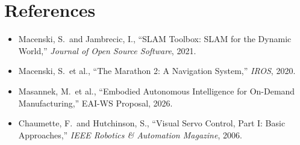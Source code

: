 \documentclass[11pt,a4paper]{article}
\begin{document}
\section{References}

\begin{itemize}[label=\textbullet, leftmargin=1.5em]
    \item Macenski, S.\ and Jambrecic, I., ``SLAM Toolbox: SLAM for the Dynamic World,''
          \textit{Journal of Open Source Software}, 2021.
    \item Macenski, S.\ et al., ``The Marathon 2: A Navigation System,'' \textit{IROS}, 2020.
    \item Masannek, M.\ et al., ``Embodied Autonomous Intelligence for On-Demand
          Manufacturing,'' EAI-WS Proposal, 2026.
    \item Chaumette, F.\ and Hutchinson, S., ``Visual Servo Control, Part I: Basic
          Approaches,'' \textit{IEEE Robotics \& Automation Magazine}, 2006.
\end{itemize}
\end{document}

